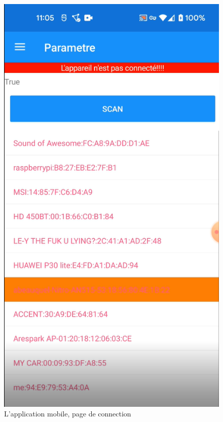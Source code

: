\documentclass[12pt,fleqn]{article}
\begin{document}
\begin{figure}[H]
  \includegraphics{images/AppMobileSetting.png}
  \caption{L'application mobile, page de connection}
\end{figure}
\end{document}
